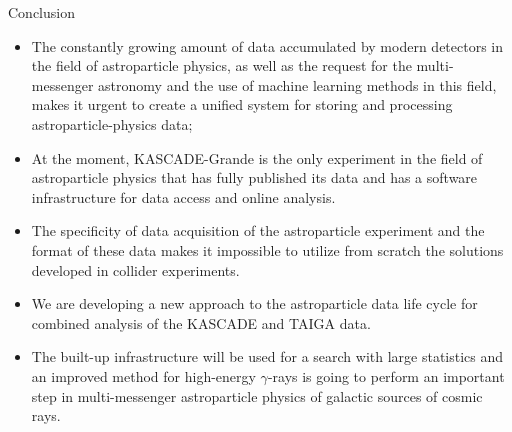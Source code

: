 \begin{frame}{Conclusion}
\small
\begin{itemize}
  \item The constantly growing amount of data accumulated by modern detectors in the field of 
  astroparticle physics, as well as the request for the multi-messenger astronomy and the use of 
  machine learning methods in this field, makes it urgent to create a unified system for storing 
  and processing astroparticle-physics data;
  \item At the moment, KASCADE-Grande is the only experiment in the field of astroparticle physics that 
  has fully published its data and has a software infrastructure for data access and online analysis.
  \item The specificity of data acquisition of the astroparticle experiment and the format of these data 
  makes it impossible to utilize from scratch the solutions developed in collider experiments.
  \item We are developing a new approach to the astroparticle data life cycle for combined analysis of the KASCADE and TAIGA data.
  \item The built-up infrastructure will be used for a search with large statistics and an improved method for 
  high-energy $\gamma$-rays is going to perform an important step in multi-messenger astroparticle physics of galactic sources of cosmic rays.  

\end{itemize}
\end{frame}

%
